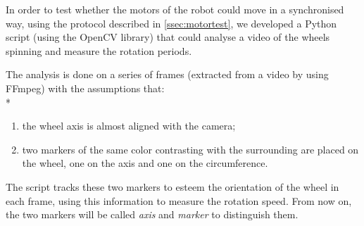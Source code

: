 In order to test whether the motors of the robot could move in a synchronised
way, using the protocol described in \autoref{ssec:motortest}, we developed a
Python script (using the OpenCV library) that could analyse a video of the
wheels spinning and measure the rotation periods.

\beforelist* The analysis is done on a series of frames (extracted from a video
by using FFmpeg) with the assumptions that:\\*
\begin{enumerate}
  \item the wheel axis is almost aligned with the camera;
  \item two markers of the same color contrasting with the surrounding are
    placed on the wheel, one on the axis and one on the circumference.
\end{enumerate}
\afterlist*
The script tracks these two markers to esteem the orientation of the wheel in
each frame, using this information to measure the rotation speed.
From now on, the two markers will be called \emph{axis} and \emph{marker} to
distinguish them.

